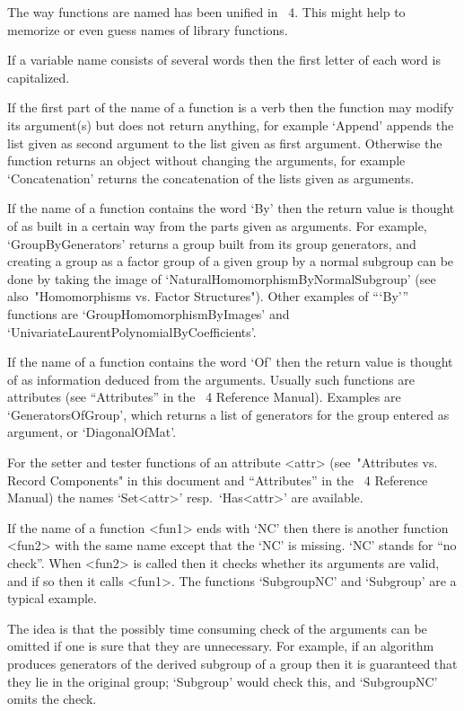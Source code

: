 The way functions are named has been unified in {\GAP}~4.
This might help to memorize or even guess names of library functions.

If a variable name consists of several words then the first
letter of each word is capitalized.

If the first part of the name of a function is a verb then the function
may modify its argument(s) but does not return anything,
for example `Append' appends the list given as second argument to the
list given as first argument.
Otherwise the function returns an object without changing the arguments,
for example `Concatenation' returns the concatenation of the lists
given as arguments.

If the name of a function contains the word `By' then the return value is
thought of as built in a certain way from the parts given as arguments.
For example, `GroupByGenerators' returns a group built from its group
generators, and creating a group as a factor group of a given group
by a normal subgroup can be done by taking the image of
`NaturalHomomorphismByNormalSubgroup'
(see also~"Homomorphisms vs. Factor Structures").
Other examples of ```By''' functions are `GroupHomomorphismByImages' and
`UnivariateLaurentPolynomialByCoefficients'.

If the name of a function contains the word `Of' then the return value is
thought of as information deduced from the arguments.
Usually such functions are attributes
(see ``Attributes'' in the {\GAP}~4 Reference Manual).
Examples are `GeneratorsOfGroup', which returns a list of generators for
the group entered as argument, or `DiagonalOfMat'.

For the setter and tester functions of an attribute <attr>
(see~"Attributes vs. Record Components" in this document
and ``Attributes'' in the {\GAP}~4 Reference Manual)
the names `Set<attr>' resp.~`Has<attr>' are available.

If the name of a function <fun1> ends with `NC' then there is another
function <fun2> with the same name except that the `NC' is missing.
`NC' stands for ``no check''.
When <fun2> is called then it checks whether its arguments are valid,
and if so then it calls <fun1>.
The functions `SubgroupNC' and `Subgroup' are a typical example.

The idea is that the possibly time consuming check of the arguments
can be omitted if one is sure that they are unnecessary.
For example, if an algorithm produces generators of the derived subgroup
of a group then it is guaranteed that they lie in the original group;
`Subgroup' would check this, and `SubgroupNC' omits the check.

